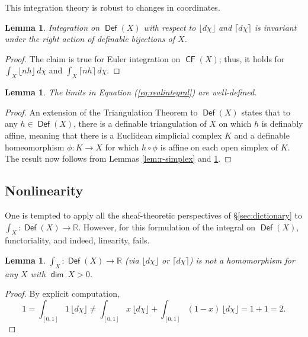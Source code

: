 \documentclass{psapm-l}
\newtheorem{lemma}[theorem]{Lemma}
\theoremstyle{definition}
\theoremstyle{remark}
\numberwithin{equation}{section}
\begin{document}
This integration theory is robust to changes in coordinates.

\begin{lemma}
\label{lem:cov}
Integration on ${{{\operatorname{\mathsf{{Def}}}}}}(X)$ with respect to ${{\lfloor d\chi\rfloor}}$ and ${{\lceil d\chi\rceil}}$ is invariant under the right action of definable bijections of $X$.
\end{lemma}
\begin{proof}
The claim is true for Euler integration on ${{{\operatorname{\mathsf{{CF}}}}}}(X)$; thus, it holds for $\int_X\lfloor nh\rfloor\,d\chi$ and $\int_X\lceil
nh\rceil\,d\chi$.
\end{proof}

\begin{lemma}
\label{lem:welldef}
The limits in Equation (\ref{eq:realintegral}) are well-defined.
\end{lemma}
\begin{proof}
An extension of the Triangulation Theorem to ${{{\operatorname{\mathsf{{Def}}}}}}(X)$ \cite{vdD} states that to any $h\in{{{\operatorname{\mathsf{{Def}}}}}}(X)$, there is a definable triangulation of $X$ on which $h$ is definably affine, meaning that there is a Euclidean simplicial complex $K$ and a definable homeomorphism $\phi\colon K\to X$ for which $h\circ\phi$ is affine on each open simplex of $K$. The result now follows from Lemmas \ref{lem:r-simplex} and \ref{lem:cov}.
\end{proof}

\subsection{Nonlinearity}
\label{sec:nonlin}

One is tempted to apply all the sheaf-theoretic perspectives of \S\ref{sec:dictionary} to $\int_X\colon{{{\operatorname{\mathsf{{Def}}}}}}(X)\to{{\mathbb R}}$. However, for this formulation of the integral on ${{{\operatorname{\mathsf{{Def}}}}}}(X)$, functoriality, and indeed, linearity, fails.

\begin{lemma}
\label{lem:nonlinear}
$\int_X\colon{{{\operatorname{\mathsf{{Def}}}}}}(X)\to{{\mathbb R}}$ (via ${{\lfloor d\chi\rfloor}}$ or ${{\lceil d\chi\rceil}}$) is not a homomorphism for any $X$ with ${{{\operatorname{\mathsf{{dim}}}}}}\ X>0$.
\end{lemma}
\begin{proof}
By explicit computation,
\[
    1 =
    \int_{[0,1]} 1\,{{\lfloor d\chi\rfloor}}
    \neq
    \int_{[0,1]} x\,{{\lfloor d\chi\rfloor}} + \int_{[0,1]} (1-x)\,{{\lfloor d\chi\rfloor}}
    = 1+1 = 2.
\]
\end{proof}
\end{document}
